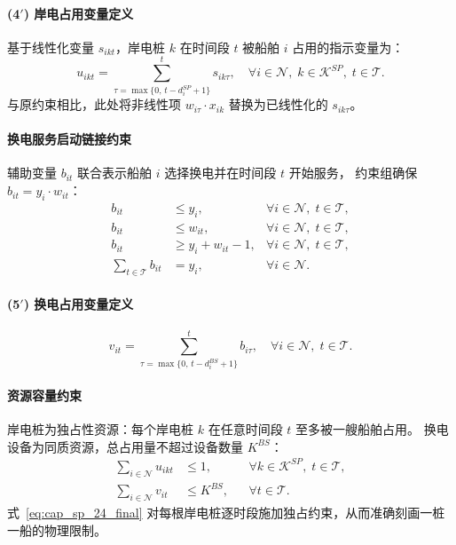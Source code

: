 \documentclass[UTF8, a4paper, 12pt]{ctexart}
\theoremstyle{plain}
\theoremstyle{definition}
\theoremstyle{remark}
\begin{document}
\paragraph{(4$'$) 岸电占用变量定义}
基于线性化变量 $s_{ikt}$，岸电桩 $k$ 在时间段 $t$ 被船舶 $i$ 占用的指示变量为：
\begin{equation}
u_{ikt} = \sum_{\tau = \max\{0,\, t-d_i^{SP}+1\}}^{t} s_{ik\tau},
\quad \forall i \in \mathcal{N},\; k \in \mathcal{K}^{SP},\; t \in \mathcal{T}.
\label{eq:link_sp_24_final}
\end{equation}
与原约束相比，此处将非线性项 $w_{i\tau} \cdot x_{ik}$ 替换为已线性化的 $s_{ik\tau}$。

\paragraph{换电服务启动链接约束}
辅助变量 $b_{it}$ 联合表示船舶 $i$ 选择换电并在时间段 $t$ 开始服务，
约束组确保 $b_{it} = y_i \cdot w_{it}$：
\begin{align}
b_{it} &\le y_i,
  & \forall i \in \mathcal{N},\; t \in \mathcal{T},
  \label{eq:lin_bs_a} \\
b_{it} &\le w_{it},
  & \forall i \in \mathcal{N},\; t \in \mathcal{T},
  \label{eq:lin_bs_b} \\
b_{it} &\ge y_i + w_{it} - 1,
  & \forall i \in \mathcal{N},\; t \in \mathcal{T},
  \label{eq:lin_bs_c} \\
\sum_{t \in \mathcal{T}} b_{it} &= y_i,
  & \forall i \in \mathcal{N}.
  \label{eq:lin_bs_d}
\end{align}

\paragraph{(5$'$) 换电占用变量定义}
\begin{equation}
v_{it} = \sum_{\tau = \max\{0,\, t-d_i^{BS}+1\}}^{t} b_{i\tau},
\quad \forall i \in \mathcal{N},\; t \in \mathcal{T}.
\label{eq:link_bs_24_final}
\end{equation}

\paragraph{资源容量约束}
岸电桩为独占性资源：每个岸电桩 $k$ 在任意时间段 $t$ 至多被一艘船舶占用。
换电设备为同质资源，总占用量不超过设备数量 $K^{BS}$：
\begin{align}
\sum_{i \in \mathcal{N}} u_{ikt}
&\le 1,
&& \forall k \in \mathcal{K}^{SP},\; t \in \mathcal{T},
\label{eq:cap_sp_24_final} \\
\sum_{i \in \mathcal{N}} v_{it}
&\le K^{BS},
&& \forall t \in \mathcal{T}.
\label{eq:cap_bs_24_final}
\end{align}
式~\eqref{eq:cap_sp_24_final} 对每根岸电桩逐时段施加独占约束，从而准确刻画一桩一船的物理限制。
\end{document}
